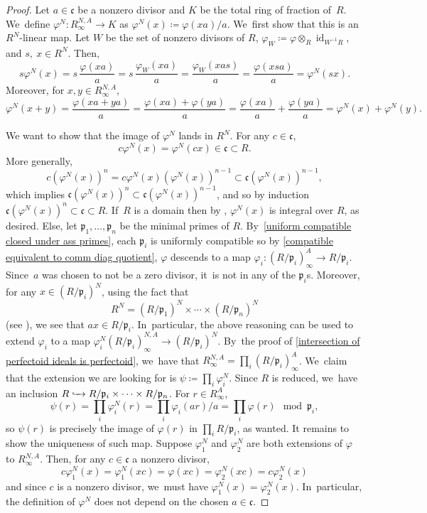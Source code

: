 \documentclass[JEP,XML,SOM,Unicode,published]{cedram}
\let\autoref\cref
\theoremstyle{plain}
\theoremstyle{definition}
\numberwithin{equation}{theorem}
\let\tensor\otimes
\newcommand{\fracc}{\mathfrak{c}}
\newcommand{\p}{\mathfrak{p}}
\DeclareMathOperator{\id}{{id}}
\newcommand{\into}[1][]{\lhook \joinrel \xrightarrow{\ #1\ }}
\renewcommand{\phi}{\varphi}
\newcommand{\inv}{^{-1}}
\newcommand{\rafty}{R^A_\infty}
\newcommand{\ranfty}{R^{N,A}_\infty}
\begin{document}
\begin{proof}
Let $a\in \fracc$ be a nonzero divisor and $K$ be the total ring of fraction of~$R$. We~define $\phi^N\colon \ranfty \to K$ as
$\phi^N
(x)\coloneqq \phi(xa)/a$. We~first show that this is an $R^N$\nobreakdash-linear map. Let $W$ be the set of nonzero divisors of $R$, $\phi_W\coloneqq \phi\tensor_R \id_{W\inv R}$, and $s,\ x\in R^N$. Then,
\[
s \phi^N(x)=s\,\frac{\phi(xa)}{a}=s\,\frac{\phi_W(xa)}{a}=\frac{\phi_W(xas)}{a}=\frac{\phi(xsa)}{a}=\phi^N(sx).
\]
Moreover, for $x,y\in \ranfty$,
\[
\phi^N(x+y)=\frac{\phi(xa+ya)}{a}=\frac{\phi(xa)+\phi(ya)}{a}=\frac{\phi(xa)}{a}+\frac{\phi(ya)}{a}=\phi^N(x)+\phi^N(y).
\]

We want to show that the image of $\phi^N$ lands in $R^N$. For any $c\in \fracc$,
\[c\phi^N(x)=\phi^N(cx)\in \fracc\subset R.\] More generally,
\[
c\left(\phi^N(x)\right)^n=c\phi^N(x)\left(\phi^N(x)\right)^{n-1}\subset \fracc \left(\phi^N(x)\right)^{n-1},
\]
which implies $\fracc\left(\phi^N(x)\right)^n\subset \fracc\left(\phi^N(x)\right)^{n-1}$, and so by induction $\fracc\left(\phi^N(x)\right)^n\subset \fracc\subset R$. If~$R$ is a domain then by \cite[Prop.\,2.4.8]{HunekeSwansonIntegralClosure}, $\phi^N(x)$ is integral over $R$, as desired. Else, let $\p_1,\ldots,\p_n$ be the minimal primes of $R$. By~\autoref{uniform compatible closed under ass primes}, each $\p_i$ is uniformly compatible so by \autoref{compatible equivalent to comm diag quotient}, $\phi$ descends to a map $\phi_i\colon (R/\p_i)^A_\infty\to R/\p_i$.
Since~$a$ was chosen to not be a zero divisor, it~is not in any of the $\p_i$s. Moreover, for any $x\in (R/\p_i)^N$, using the fact that
\[R^N=(R/\p_1)^N\times \cdots \times (R/\p_n)^N\]
(see \eg \cite[Cor.\,2.1.13]{HunekeSwansonIntegralClosure}),
we see that $ax\in R/\p_i$. In~particular, the above reasoning can be used to extend $\phi_i$ to a map $\phi_i^N(R/\p_i)^{N,A}_\infty \to (R/\p_i)^N$. By~the proof of \autoref{intersection of perfectoid ideals is perfectoid}, we~have that $\ranfty=\prod_i (R/\p_i)^A_\infty$. We~claim that the extension we are looking for is $\psi\coloneqq \prod_i \phi^N_i$. Since $R$ is reduced, we~have an inclusion $R\into R/\p_i\times \cdots \times R/\p_n$.
For $r\in \rafty$,
\[
\psi(r)=\prod_i \phi^N_i(r)=\prod_i \phi_i(ar)/a=\prod_i \phi(r) \mod{\p_i},
\]
so $\psi(r)$ is precisely the image of $\phi(r)$ in $\prod_i R/\p_i$, as wanted.
It remains to show the uniqueness of such map. Suppose $\phi^N_1$ and $\phi^N_2$ are both extensions of $\phi$ to $\ranfty$. Then, for any $c\in \fracc$ a nonzero divisor,
\[
c\phi^N_1(x)=\phi^N_1(xc)=\phi(xc)=\phi^N_2(xc)=c\phi^N_2(x)
\]
and since $c$ is a nonzero divisor, we~must have $\phi^N_1(x)=\phi^N_2(x)$. In~particular, the definition of $\phi^N$ does not depend on the chosen $a\in \fracc$.
\end{proof}
\end{document}
